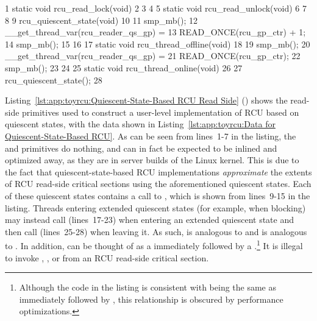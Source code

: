 \begin{listing}[tbp]
{ \scriptsize
\begin{verbbox}
  1 static void rcu_read_lock(void)
  2 {
  3 }
  4
  5 static void rcu_read_unlock(void)
  6 {
  7 }
  8
  9 rcu_quiescent_state(void)
 10 {
 11   smp_mb();
 12   __get_thread_var(rcu_reader_qs_gp) =
 13     READ_ONCE(rcu_gp_ctr) + 1;
 14   smp_mb();
 15 }
 16
 17 static void rcu_thread_offline(void)
 18 {
 19   smp_mb();
 20   __get_thread_var(rcu_reader_qs_gp) =
 21     READ_ONCE(rcu_gp_ctr);
 22   smp_mb();
 23 }
 24
 25 static void rcu_thread_online(void)
 26 {
 27   rcu_quiescent_state();
 28 }
\end{verbbox}
}
\centering
\theverbbox
\caption{Quiescent-State-Based RCU Read Side}
\label{lst:app:toyrcu:Quiescent-State-Based RCU Read Side}
\end{listing}

Listing~\ref{lst:app:toyrcu:Quiescent-State-Based RCU Read Side}
()
shows the read-side primitives used to construct a user-level
implementation of RCU based on quiescent states, with the data shown in
Listing~\ref{lst:app:toyrcu:Data for Quiescent-State-Based RCU}.
As can be seen from lines~1-7 in the listing, the 
and  primitives do nothing, and can in fact
be expected to be inlined and optimized away, as they are in
server builds of the Linux kernel.
This is due to the fact that quiescent-state-based RCU implementations
\emph{approximate} the extents of RCU read-side critical sections
using the aforementioned quiescent states.
Each of these quiescent states contains a call to
, which is shown from lines~9-15 in the listing.
Threads entering extended quiescent states (for example, when blocking)
may instead call  (lines~17-23) when entering
an extended quiescent state and then call
 (lines~25-28) when leaving it.
As such,  is analogous to 
and  is analogous to .
In addition,  can be thought of as a
 immediately followed by a
.\footnote{
	Although the code in the listing is consistent with
	being the same as  immediately followed by
	, this relationship is obscured by
	performance optimizations.}
It is illegal to invoke , ,
or  from an RCU read-side critical section.

